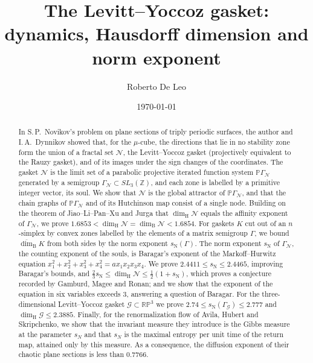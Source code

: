 \documentclass[11pt]{amsart}
\theoremstyle{definition}
\theoremstyle{remark}
\newcommand{\Z}{\mathbb Z}
\newcommand{\RP}{\mathbb{RP}}
\newcommand{\cN}{\mathcal N}
\newcommand{\GN}{\Gamma_{\mathcal N}}
\newcommand{\PGN}{{\mathbb P}\Gamma_{\mathcal N}}
\newcommand{\cG}{\mathcal G}
\newcommand{\GG}{\Gamma_{\mathcal G}}
\newcommand{\udimB}{\overline{\dim}_{\mathrm B}}
\newcommand{\sN}{s_{\mathrm N}}
\newcommand{\dimH}{\dim_{\mathrm H}}
\newcommand{\dimB}{\dim_{\mathrm B}}
\begin{document}
\title[The Levitt--Yoccoz gasket]{The Levitt--Yoccoz gasket:\\ dynamics, Hausdorff dimension and norm exponent}
\author{Roberto De Leo}
\address{Department of Mathematics, Howard University, Washington, DC 20059, USA}
\date{\today}

\begin{abstract}
In S.\,P.~Novikov's problem on plane sections of triply periodic surfaces, the author and I.\,A.~Dynnikov showed that, for the $\mu$-cube, the directions that lie in no stability zone form the union of a fractal set $\cN$, the Levitt--Yoccoz gasket (projectively equivalent to the Rauzy gasket), and of its images under the sign changes of the coordinates. The gasket $\cN$ is the limit set of a parabolic projective iterated function system $\PGN$ generated by a semigroup $\GN\subset SL_3(\Z)$, and each zone is labelled by a primitive integer vector, its soul.
We show that $\cN$ is the global attractor of $\PGN$, and that the chain graphs of $\PGN$ and of its Hutchinson map consist of a single node.
Building on the theorem of Jiao--Li--Pan--Xu and Jurga that $\dimH\cN$ equals the affinity exponent of $\GN$, we prove $1.6853<\dimH\cN=\dimB\cN<1.6854$.
For gaskets $K$ cut out of an $n$-simplex by convex zones labelled by the elements of a matrix semigroup $\Gamma$, we bound $\udimB K$ from both sides by the norm exponent $\sN(\Gamma)$.
The norm exponent $\sN$ of $\GN$, the counting exponent of the souls, is Baragar's exponent of the Markoff--Hurwitz equation $x_1^2+x_2^2+x_3^2+x_4^2=ax_1x_2x_3x_4$. We prove $2.4411\le\sN\le2.4465$, improving Baragar's bounds, and $\frac23\sN\le\dimH\cN\le\frac12(1+\sN)$, which proves a conjecture recorded by Gamburd, Magee and Ronan; and we show that the exponent of the equation in six variables exceeds $3$, answering a question of Baragar.
For the three-dimensional Levitt--Yoccoz gasket $\cG\subset\RP^3$ we prove $2.74\le\sN(\GG)\le2.777$ and $\dimH\cG\le2.3885$.
Finally, for the renormalization flow of Avila, Hubert and Skripchenko, we show that the invariant measure they introduce is the Gibbs measure at the parameter $s_N$ and that $s_N$ is the maximal entropy per unit time of the return map, attained only by this measure. 
As a consequence, the diffusion exponent of their chaotic plane sections is less than 0.7766.
\end{abstract}
\end{document}

